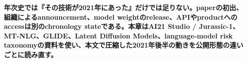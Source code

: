 \noindent\textbf{年次史では『その技術が2021年にあった』だけでは足りない。paperの初出、組織によるannouncement、model weightのrelease、APIやproductへのaccessは別のchronology stateである。本章はAI21 Studio / Jurassic-1、MT-NLG、GLIDE、Latent Diffusion Models、language-model risk taxonomyの資料を使い、本文で圧縮した2021年後半の動きを公開形態の違いごとに読み直す。}\autocite{src-20fd9bba2e7a,src-50244427230b,src-a4561c635fe6,src-b307b4b82867,src-bf581c89a17f}
